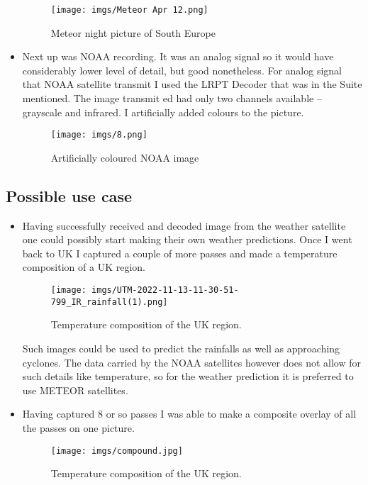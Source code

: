 \documentclass{article}
\begin{document}
\begin{itemize}
            \begin{figure}[H]
                    \centering
                    \texttt{[image: imgs/Meteor Apr 12.png]}
                    \caption{Meteor night picture of South Europe}
                    \label{img:mount}
                \end{figure}

            \item[] Next up was NOAA recording. It was an analog signal so it would have considerably lower level of detail, but good nonetheless. For analog signal that NOAA satellite transmit I used the LRPT Decoder that was in the Suite mentioned. The image transmit ed had only two channels available -- grayscale and infrared. I artificially added colours to the picture.

            \begin{figure}[H]
                    \centering
                    \texttt{[image: imgs/8.png]}
                    \caption{Artificially coloured NOAA image}
                    \label{img:mount}
                \end{figure}   
    
        \end{itemize}
    \subsection{Possible use case}
        \begin{itemize}
            \item[] Having successfully received and decoded image from the weather satellite one could possibly start making their own weather predictions. Once I went back to UK I captured a couple of more passes and made a temperature composition of a UK region.

            \begin{figure}[H]
                    \centering
                    \texttt{[image: imgs/UTM-2022-11-13-11-30-51-799\_IR\_rainfall(1).png]}
                    \caption{Temperature composition of the UK region.}
                    \label{img:mount}
                \end{figure}  

            Such images could be used to predict the rainfalls as well as approaching cyclones. The data carried by the NOAA satellites however does not allow for such details like temperature, so for the weather prediction it is preferred to use METEOR satellites.
                
            \item[] Having captured 8 or so passes I was able to make a composite overlay of all the passes on one picture.

            \begin{figure}[H]
                    \centering
                    \texttt{[image: imgs/compound.jpg]}
                    \caption{Temperature composition of the UK region.}
                    \label{img:mount}
            \end{figure}  
            
        \end{itemize}
\end{document}
